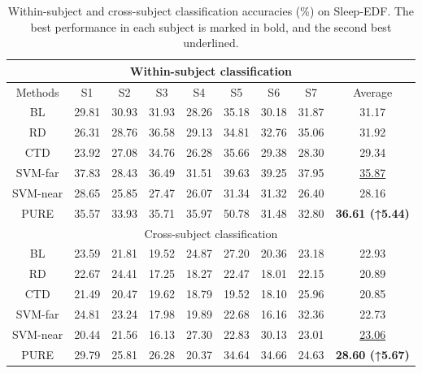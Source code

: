 \documentclass[journal,twocolumn]{IEEEtran}
\begin{document}
\begin{table}[htpb] \centering
  \caption{Within-subject and cross-subject classification accuracies (\%) on Sleep-EDF. The best performance in each subject is marked in bold, and the second best underlined.}
  \label{tab:sleep-edfx-result}
  \begin{tabular}{c|c|c|c|c|c|c|c|c}
  \toprule
  \multicolumn{9}{c}{Within-subject classification} \\
  \midrule
  Methods & S1 & S2 & S3 & S4 & S5 & S6 & S7 & Average \\
  \midrule
  BL & 29.81 & 30.93 & 31.93 & 28.26 & 35.18 & 30.18 & 31.87 & 31.17 \\
  RD & 26.31 & 28.76 & 36.58 & 29.13 & 34.81 & 32.76 & 35.06 & 31.92 \\
  CTD & 23.92 & 27.08 & 34.76 & 26.28 & 35.66 & 29.38 & 28.30 & 29.34 \\
  SVM-far & 37.83 & 28.43 & 36.49 & 31.51 & 39.63 & 39.25 & 37.95 & \underline{35.87} \\
  SVM-near & 28.65 & 25.85 & 27.47 & 26.07 & 31.34 & 31.32 & 26.40 & 28.16 \\
  PURE & 35.57 & 33.93 & 35.71 & 35.97 & 50.78 & 31.48 & 32.80 & \textbf{36.61 (↑5.44)} \\
  \midrule
  \multicolumn{9}{c}{Cross-subject classification} \\
  \midrule
  BL & 23.59 & 21.81 & 19.52 & 24.87 & 27.20 & 20.36 & 23.18 & 22.93 \\
  RD & 22.67 & 24.41 & 17.25 & 18.27 & 22.47 & 18.01 & 22.15 & 20.89 \\
  CTD & 21.49 & 20.47 & 19.62 & 18.79 & 19.52 & 18.10 & 25.96 & 20.85 \\
  SVM-far & 24.81 & 23.24 & 17.98 & 19.89 & 22.68 & 16.16 & 32.36 & 22.73 \\
  SVM-near & 20.44 & 21.56 & 16.13 & 27.30 & 22.83 & 30.13 & 23.01 & \underline{23.06} \\
  PURE & 29.79 & 25.81 & 26.28 & 20.37 & 34.64 & 34.66 & 24.63 & \textbf{28.60 (↑5.67)} \\
  \bottomrule
  \end{tabular}
\end{table}
\end{document}
